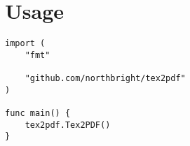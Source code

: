 \section{Usage}

\begin{verbatim}
import (
    "fmt"

    "github.com/northbright/tex2pdf"
)

func main() {
    tex2pdf.Tex2PDF()
}
\end{verbatim}
